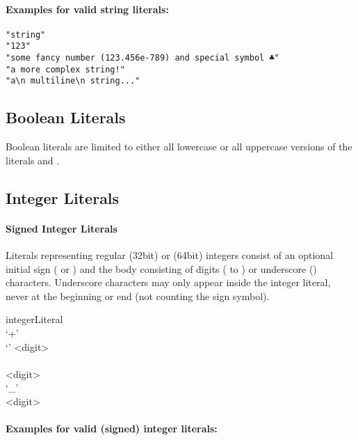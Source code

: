 \documentclass[11pt,a4paper]{report}
\begin{document}
\paragraph{Examples for valid string literals:}

\begin{Verbatim}[samepage=true]
"string"
"123"
"some fancy number (123.456e-789) and special symbol ♣"
"a more complex string!"
"a\n multiline\n string..."
\end{Verbatim}

\subsection{Boolean Literals}
\label{sec:boolean-literals}

Boolean literals are limited to either all lowercase or all uppercase versions of the literals  and .

\subsection{Integer Literals}
\label{sec:integer-literals}

\paragraph{Signed Integer Literals}
Literals representing regular  (32bit) or  (64bit) integers consist of an optional initial sign (\lit{+} or \lit{-}) and the body consisting of digits ( to ) or underscore (\lit{\_}) characters.
Underscore characters may only appear inside the integer literal, never at the beginning or end (not counting the sign symbol).

\begin{gram}
	\label{gram:integer}
	\begin{rrdiag*}{integerLiteral}
		\sst \\ `+' \\ `\textminus' \est
			<digit> \sst \\ \sst \\ \srp \sst <digit> \\ `\_' \est \\ \erp \est <digit> \est
	\end{rrdiag*}
\end{gram}

\paragraph{Examples for valid (signed) integer literals:}
\end{document}
